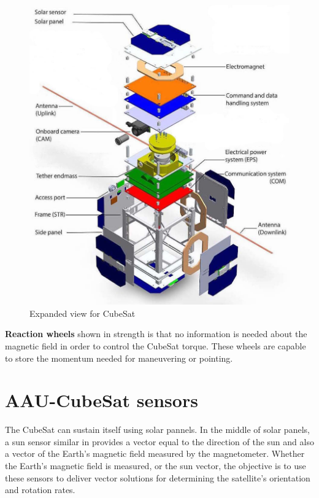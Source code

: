 \begin{table}[H]
\begin{minipage}[b]{0.49\linewidth}
\begin{figure}[H]
			\includegraphics[width=1\linewidth]{figures/cubsat1}
			\caption{Expanded view for CubeSat \cite{view}}
			\label{fig:csat}
		\end{figure}
	\end{minipage}
\end{table}
%
\textbf{Reaction wheels} shown in  strength is that no information is needed about the magnetic field in order to control the CubeSat torque. These wheels are capable to store the momentum needed for maneuvering or pointing.
\section{AAU-CubeSat sensors}
The CubeSat can sustain itself using solar pannels. In the middle of solar panels, a sun sensor similar in  provides a vector equal to the direction of the sun and also a vector of the Earth's magnetic field measured by the magnetometer. Whether the Earth’s magnetic field is measured, or the sun vector, the objective is to use these sensors to deliver vector solutions for determining the satellite’s orientation and rotation rates.

